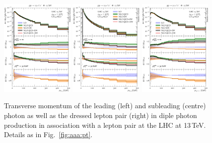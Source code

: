 \begin{figure}[t!]
  \centering
  \includegraphics[width=0.32\textwidth]{figs_aaz/pT_y1}
  \includegraphics[width=0.32\textwidth]{figs_aaz/pT_y2}
  \includegraphics[width=0.32\textwidth]{figs_aaz/pT_l1l2_comb_log}
  \caption{
    Transverse momentum of the leading (left) and subleading (centre) 
    photon as well as the dressed lepton pair (right) 
    in diple photon production in association with a lepton pair 
    at the LHC at 13\,TeV. 
    Details as in Fig.\ \ref{fig:aaa:pt}.
    \label{fig:aaz:pt}
  }
\end{figure}

